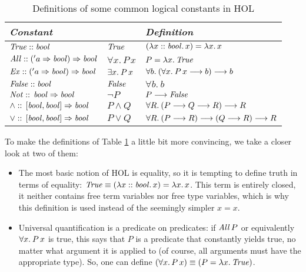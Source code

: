 \begin{table}
  \centering \renewcommand{\arraystretch}{1.3}
  \begin{tabular}{|l|l@{$\quad\equiv\quad$}l|}\hline
    \multicolumn{2}{|l}{\emph{Constant}} & \emph{Definition} \\\hline
    $\mathit{True} :: \mathit{bool}$ &
    $\mathit{True}$           & $({\lambda x::\mathit{bool}.\,x}) =
    {\lambda x.\,x}$\\\hline 
    $\mathit{All} :: ('a \Rightarrow \mathit{bool}) \Rightarrow \mathit{bool}$ &
    $\forall x.\, P\, x$      & $P = {\lambda x.\,\mathit{True}}$\\\hline
    $\mathit{Ex} :: ('a \Rightarrow\mathit{bool}) \Rightarrow \mathit{bool}$ &
    $\exists x.\: P\, x$    & $\forall b.\: (\forall x.\: P\, x \longrightarrow b) \longrightarrow b$\\\hline
    $\mathit{False} :: \mathit{bool}$ &
    $\mathit{False}$          & $\forall b.\ b$\\\hline
    $\mathit{Not} ::\, \mathit{bool} \Rightarrow \mathit{bool}$ &
    $\lnot P$            & $P \longrightarrow \mathit{False}$\\\hline
    $\land  ::\, [\mathit{bool}, \mathit{bool}] \Rightarrow \mathit{bool}$ &
    $P \land Q$          & $\forall R.\: (P \longrightarrow Q \longrightarrow R) \longrightarrow R$\\\hline
    $\lor ::\, [\mathit{bool},\mathit{bool}] \Rightarrow \mathit{bool}$ &
    $P \lor Q$          & $\forall R.\: (P\longrightarrow R)\longrightarrow(Q\longrightarrow R)\longrightarrow R$\\\hline
  \end{tabular}
  \caption{Definitions of some common logical constants in HOL}
  \label{tab:defn-logic-op}
\end{table}

\begin{expl}
  To make the definitions of Table \ref{tab:defn-logic-op} a little bit more
  convincing, we take a closer look at two of them:
  \begin{itemize}
  \item The most basic notion of HOL is equality, so it is tempting to define
    truth in terms of equality: $\mathit{True} \equiv ({\lambda x::\mathit{bool}.\,x}) =
    {\lambda x.\,x}$. This term is entirely closed, \IE it neither contains
    free term variables nor free type variables, which is why this definition is
    used instead of the seemingly simpler $x=x$.
  \item Universal quantification is a predicate on predicates: if $\mathit{All}\,P$
    or equivalently $\forall x.\: P\,x$ is true, this says that $P$ is a predicate
    that constantly yields true, no matter what argument it is applied to (of
    course, all arguments must have the appropriate type). So, one can define
    $(\forall x.\, P\, x) \equiv (P = {\lambda x.\,\mathit{True}})$.
  \end{itemize}
\end{expl}



